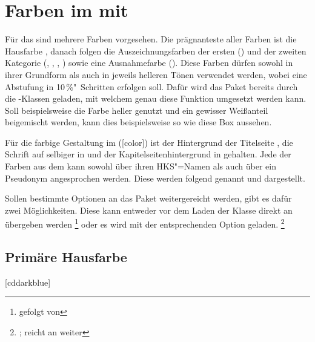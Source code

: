 \documentclass[%
  english,ngerman,%
  headings=optiontoheadandtoc,captions=tableheading,numbers=noenddot,%
  chapterpage,cdfoot,%
]{tudscrman}
\begin{document}
\section{Farben im \CD mit }
%
Für das \CD sind mehrere Farben vorgesehen. Die prägnanteste aller Farben ist 
die Hausfarbe , danach folgen die Auszeichnungsfarben der ersten
() und der zweiten Kategorie (, , 
, ) sowie eine Ausnahmefarbe (). Diese 
Farben dürfen sowohl in ihrer Grundform als auch in jeweils helleren Tönen 
verwendet werden, wobei eine Abstufung in 10\,\%"~Schritten erfolgen soll. Dafür 
wird das Paket  bereits durch die \TUDScript-Klassen geladen, 
mit welchem genau diese Funktion umgesetzt werden kann. Soll beispielsweise die 
Farbe  heller genutzt und ein gewisser Weißanteil beigemischt 
werden, kann dies beispielsweise so wie diese Box 
\colorbox{HKS44!20}{} aussehen.

Für die farbige Gestaltung im \CD ([color]) ist der Hintergrund der 
Titelseite , die Schrift auf selbiger in  und 
der Kapitelseitenhintergrund in  gehalten. Jede der Farben aus 
dem \CD kann sowohl über ihren HKS"=Namen als auch über ein Pseudonym 
angesprochen werden. Diese werden folgend genannt und dargestellt.

Sollen bestimmte Optionen an das Paket  weitergereicht werden, 
gibt es dafür zwei Möglichkeiten. Diese kann entweder vor dem Laden der Klasse 
direkt an  übergeben werden%
\footnote{%
   gefolgt von
} oder es wird  mit der entsprechenden Option geladen.%
\footnote{
  ;
   reicht  an  weiter
}

\subsection{Primäre Hausfarbe}
\begin{Declaration}{[cddarkblue]}
\printdeclarationlist%
\end{Declaration}
\end{document}
